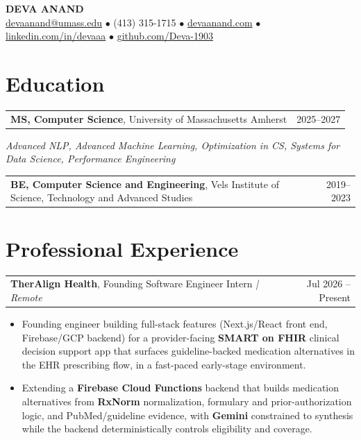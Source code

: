 \documentclass[letterpaper,11pt]{article}
\makeatletter
\newcommand{\eduItem}[3]{%
  \begin{tabular*}{\textwidth}{@{}l@{\extracolsep{\fill}}r@{}}
    \textbf{#1}, #2 & #3 \\
  \end{tabular*}\par
}
\newcommand{\expItem}[4]{%
  \vspace{2pt}
  \begin{tabular*}{\textwidth}{@{}l@{\extracolsep{\fill}}r@{}}
    \textbf{#1}, #2 \textit{| #3} & #4 \\
  \end{tabular*}\par\vspace{-3pt}
}
\makeatother
\begin{document}
\begin{center}
    {\fontsize{18}{20}\selectfont\bfseries DEVA ANAND}\\ \vspace{3pt}
    {\small
    \href{mailto:devaanand@umass.edu}{devaanand@umass.edu}
    \enspace$\bullet$\enspace
    (413) 315-1715
    \enspace$\bullet$\enspace
    \href{https://devaanand.com}{devaanand.com}
    \enspace$\bullet$\enspace
    \href{https://linkedin.com/in/devaaa/}{linkedin.com/in/devaaa}
    \enspace$\bullet$\enspace
    \href{https://github.com/Deva-1903}{github.com/Deva-1903}}
\end{center}
\vspace{-8pt}

\section{Education}
\eduItem{MS, Computer Science}{University of Massachusetts Amherst}{2025--2027}
{\small\textit{Advanced NLP, Advanced Machine Learning, Optimization in CS, Systems for Data Science, Performance Engineering}}\par
\vspace{3pt}
\eduItem{BE, Computer Science and Engineering}{Vels Institute of Science, Technology and Advanced Studies}{2019--2023}

\section{Professional Experience}

\expItem{TherAlign Health}{Founding Software Engineer Intern}{Remote}{Jul 2026 -- Present}
\begin{itemize}
  \item Founding engineer building full-stack features (Next.js/React front end, Firebase/GCP backend) for a provider-facing \textbf{SMART on FHIR} clinical decision support app that surfaces guideline-backed medication alternatives in the EHR prescribing flow, in a fast-paced early-stage environment.
  \item Extending a \textbf{Firebase Cloud Functions} backend that builds medication alternatives from \textbf{RxNorm} normalization, formulary and prior-authorization logic, and PubMed/guideline evidence, with \textbf{Gemini} constrained to synthesis while the backend deterministically controls eligibility and coverage.
\end{itemize}
\end{document}
